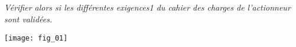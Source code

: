 \begin{multicols}{2}
\subparagraph{}\textit{Vérifier alors si les différentes exigences1 du cahier des charges de l’actionneur sont validées.
}
\ifprof
\begin{corrige}
\end{corrige}
\else
\fi

\end{multicols}


\begin{center}
\texttt{[image: fig\_01]}
\end{center}
%
%
%
%